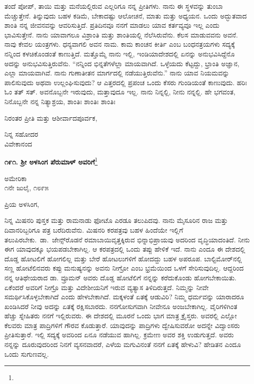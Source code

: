 ತಂದೆ ಪೋಪ್, ತಾಯಿ ಮತ್ತು ಮನೆಯಲ್ಲಿರುವ ಎಲ್ಲರಿಗೂ ನನ್ನ ಪ್ರೀತಿಗಳು. ನಾನು ಈ ಸ್ಥಳವನ್ನು ತುಂಬಾ ಮೆಚ್ಚುತ್ತೇನೆ. ತಿನ್ನುವುದು ಬಹಳ ಕಡಿಮೆ, ಬೇಕಾದಷ್ಟು ಆಲೋಚನೆ, ಮಾತು ಮತ್ತು ಅಧ್ಯಯನ. ಒಂದು ಅದ್ಭುತವಾದ ಶಾಂತಿ ನನ್ನ ಜೀವನವನ್ನು ಆವರಿಸುತ್ತಿದೆ. ಪ್ರತಿದಿನವೂ ನನಗೆ ಮಾಡಲು ಯಾವ ಕರ್ತವ್ಯವೂ ಇಲ್ಲ ಎಂದು ಭಾವಿಸುತ್ತೇನೆ. ನಾನು ಯಾವಾಗಲೂ ವಿಶ್ರಾಂತಿ ಮತ್ತು ಶಾಂತಿಯಲ್ಲಿ ನೆಲೆಸಿರುವೆನು. ಕೆಲಸ ಮಾಡುವವನು ಅವನೆ. ನಾವು ಕೇವಲ ಯಂತ್ರಗಳು. ಧನ್ಯವಾಗಲಿ ಅವನ ನಾಮ. ಕಾಮ ಕಾಂಚನ ಕೀರ್ತಿ ಎಂಬ ಬಂಧನತ್ರಯಗಳು ಸದ್ಯಕ್ಕೆ ನನ್ನಿಂದ ಕಳಚಿಕೊಂಡಂತೆ ಕಾಣುತ್ತಿದೆ. ಮತ್ತೊಮ್ಮೆ ನಾನು ಇಲ್ಲಿ, ಇಂಡಿಯಾದೇಶದಲ್ಲಿ ಏನನ್ನು ಅನುಭವಿಸಿದ್ದೆನೊ ಅದನ್ನು ಅನುಭವಿಸುತ್ತಿರುವೆನು. ``ನನ್ನಿಂದ ಭಿನ್ನತೆಗಳೆಲ್ಲಾ ಮಾಯವಾಗಿದೆ. ಒಳ್ಳೆಯದು ಕೆಟ್ಟದ್ದು, ಭ್ರಾಂತಿ ಅಜ್ಞಾನ, ಎಲ್ಲಾ ಮಾಯವಾಗಿವೆ. ನಾನು ಗುಣಾತೀತನ ಮಾರ್ಗದಲ್ಲಿ ನಡೆಯುತ್ತಿರುವೆನು.''\enginline{-} ನಾನು ಯಾವ ನಿಯಮವನ್ನು ಪಾಲಿಸುವುದು ಅಥವಾ ಉಲ್ಲಂಘಿಸುವುದು? ಆ ಎತ್ತರದಲ್ಲಿ ಪ್ರಪಂಚ ಒಂದು ಕೆಸರು ಗುಂಡಿಯಂತೆ ಕಾಣುವುದು. ಹರಿಃ ಓಂ ತತ್ ಸತ್. ಅವನೊಬ್ಬನೇ ಇರುವುದು, ಮತ್ತಾವುದೂ ಇಲ್ಲ. ನಾನು ನಿನ್ನಲ್ಲಿ, ನೀನು ನನ್ನಲ್ಲಿ. ಹೇ ಭಗವಂತ, ನಿನೊಬ್ಬನೇ ನನ್ನ ನಿತ್ಯಾಶ್ರಯ, ಶಾಂತಿಃ ಶಾಂತಿಃ ಶಾಂತಿಃ

ನಿರಂತರ ಪ್ರೀತಿ ಮತ್ತು ಆಶೀರ್ವಾದಪೂರ್ವಕ,

\vspace{-0.6cm}

{\flushright
ನಿನ್ನ ಸಹೋದರ\\ವಿವೇಕಾನಂದ\par}

\begin{center}
\textbf{೧೯೧. ಶ‍್ರೀ ಅಳಸಿಂಗ ಪೆರುಮಾಳ್ ಅವರಿಗೆ}\footnote{}
\end{center}

\vspace{-0.6cm}

\begin{flushright}
ಅಮೇರಿಕಾ\\೧ನೇ ಜುಲೈ, ೧೮೯೫
\end{flushright}

\noindent
ಪ್ರಿಯ ಅಳಸಿಂಗ,

ನಿನ್ನ ಮಿಷನರಿ ಪುಸ್ತಕ ಮತ್ತು ರಾಮನಾಡು ಫೋಟೊ ಎರಡೂ ತಲುಪಿದವು. ನಾನು ಮೈಸೂರಿನ ರಾಜ ಮತ್ತು ದಿವಾನರಿಬ್ಬರಿಗೂ ಪತ್ರ ಬರೆದಿರುವೆನು. ಮಿಷನರಿ ಕರಪತ್ರವು ಬಹಳ ಹಿಂದೆಯೇ ಇಲ್ಲಿಗೆ ತಲುಪಿರಬೇಕು.~ಡಾ.~ಜೇನ್ಸ್‌ರೊಡನೆ ರಮಾಬಾಯಿ\break ವೃತ್ತಕ್ಕಿರುವ ಭಿನ್ನಾಭಿಪ್ರಾಯವು ಅದರಿಂದ ವೃದ್ಧಿಯಾದಂತಿದೆ. ನೀನು ಈಗ ಯಾವುದಕ್ಕೂ ಭಯಪಡಬೇಕಾಗಿಲ್ಲ. ಆ ಕರಪತ್ರದಲ್ಲಿ ಒಂದು ತಪ್ಪು ಹೇಳಿಕೆ ಇದೆ. ನಾನು ಎಂದೂ ಈ ದೇಶದಲ್ಲಿ ದೊಡ್ಡ ಹೋಟಲಿಗೆ ಹೋಗಲಿಲ್ಲ ಮತ್ತು ಬೇರೆ ಹೋಟಲುಗಳಿಗೆ ಹೋದದ್ದು ಬಹಳ ಅಪರೂಪ. ಬಾಲ್ಟಿಮೋರ್‌ನಲ್ಲಿ ಸಣ್ಣ ಹೋಟೆಲಿನವರು ಕಪ್ಪು ಮನುಷ್ಯನನ್ನು ಅವನು ನೀಗ್ರೋ ಎಂಬ ಭ್ರಮೆಯಿಂದ ಒಳಗೆ ಸೇರಿಸುವುದಿಲ್ಲ. ಆದ್ದರಿಂದ ನನ್ನ ಆತಿಥೇಯರಾದ ಡಾ. ವ್ರೂಮನ್ ಅವರು ದೊಡ್ಡ ಹೋಟೆಲಿಗೆ ನನ್ನನ್ನು ಕರೆದುಕೊಂಡು ಹೋಗಬೇಕಾಯಿತು. ಏಕೆಂದರೆ ಅವರಿಗೆ ನೀಗ್ರೊ ಮತ್ತು ವಿದೇಶೀಯನಿಗೆ ಇರುವ ವ್ಯತ್ಯಾಸ ತಿಳಿದಿರುತ್ತದೆ. ನಿಮ್ಮನ್ನು ನೀವೇ ಸಮರ್ಥಿಸಿಕೊಳ್ಳಬೇಕಾಗಿದೆ ಎಂದು ಹೇಳಬೇಕಾಗಿದೆ. ಮಕ್ಕಳಂತೆ ಏತಕ್ಕೆ ಆಡುವಿರಿ? ನಿಮ್ಮ ಧರ್ಮವನ್ನು ಯಾರಾದರೂ ಖಂಡಿಸಿದರೆ ನೀವು ಅದನ್ನು ಏತಕ್ಕೆ ರಕ್ಷಿಸಬಾರದು. ನನಗೋಸುಗವಾಗಿ ನೀವೇನೂ ಅಂಜಬೇಕಾಗಿಲ್ಲ. ವೈರಿಗಳಿಗಿಂತ ಹೆಚ್ಚು ಸ್ನೇಹಿತರು ನನಗೆ ಇಲ್ಲಿರುವರು. ಈ ದೇಶದಲ್ಲಿ ಮೂರನೆ ಒಂದು ಭಾಗ ಮಾತ್ರ ಕ್ರೈಸ್ತರು. ಅವರಲ್ಲಿ ಎಲ್ಲೋ ಕೆಲವರು ಮಾತ್ರ ಪಾದ್ರಿಗಳಿಗೆ ಗೌರವ ಕೊಡುತ್ತಾರೆ. ಯಾವುದನ್ನು ಪಾದ್ರಿಗಳು ದ್ವೇಷಿಸುವರೋ ಅದನ್ನೇ ವಿದ್ವಾಂಸರು ಪ್ರೀತಿಸುತ್ತಾರೆ. ಇಲ್ಲಿ ಸದ್ಯಕ್ಕೆ ಅವರಿಂದ ಏನೂ ನಡೆಯುವ ಹಾಗಿಲ್ಲ. ಕ್ರಮೇಣ ಅವರ ಶಕ್ತಿ ಉಡುಗುತ್ತದೆ. ಅವರು ನನ್ನನ್ನು ದೂರುವುದರಿಂದ ನಿನಗೆ ವ್ಯಸನವಾದರೆ, ಎಳೆಯ ಮಗುವಿನಂತೆ ನನಗೆ ಏತಕ್ಕೆ ಹೇಳುವಿ? ಹೇಡಿತನ ಎಂದೂ ಒಂದು ಸುಗುಣವಲ್ಲ.


